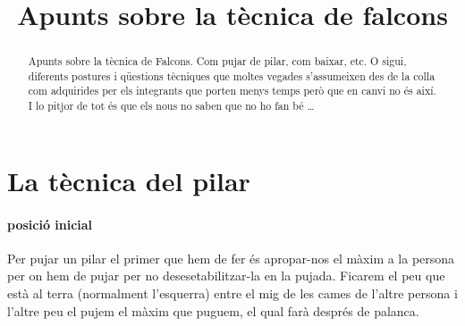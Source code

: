 \documentclass[a4paper]{article}
\begin{document}
\title{Apunts sobre la tècnica de falcons}
\maketitle
\begin{abstract}
	Apunts sobre la tècnica de Falcons. Com pujar de pilar, com baixar, etc. O sigui, diferents postures i qüestions tècniques que moltes vegades s'assumeixen des de la colla com adquirides per els integrants que porten menys temps però que en canvi no \'es així. I lo pitjor de tot \'es que els nous no saben que no ho fan b\'e \ldots
\end{abstract}

\section{La tècnica del pilar}
\paragraph{posició inicial \\}
Per pujar un pilar el primer que hem de fer \'es apropar-nos el màxim a la persona per on hem de pujar per no desesetabilitzar-la en la pujada. Ficarem el peu que està al terra (normalment l'esquerra) entre el mig de les cames de l'altre persona i l'altre peu el pujem el màxim que puguem, el qual farà despr\'es de palanca.

\end{document}
